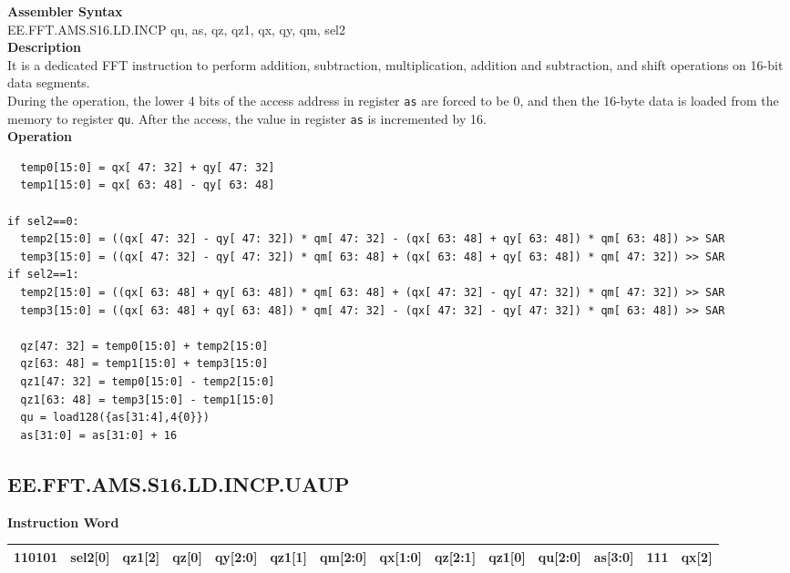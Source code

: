 \textbf{Assembler Syntax} \\
EE.FFT.AMS.S16.LD.INCP qu, as, qz, qz1, qx, qy, qm, sel2 \\
\textbf{Description} \\
It is a dedicated FFT instruction to perform addition, subtraction, multiplication, addition and subtraction, and shift operations on 16-bit data segments.\\
During the operation, the lower 4 bits of the access address in register \lstinline{as} are forced to be 0, and then the 16-byte data is loaded from the memory to register \lstinline{qu}. After the access, the value in register \lstinline{as} is incremented by 16.\\
\textbf{Operation}
\begin{lstlisting}
  temp0[15:0] = qx[ 47: 32] + qy[ 47: 32]
  temp1[15:0] = qx[ 63: 48] - qy[ 63: 48]

if sel2==0:
  temp2[15:0] = ((qx[ 47: 32] - qy[ 47: 32]) * qm[ 47: 32] - (qx[ 63: 48] + qy[ 63: 48]) * qm[ 63: 48]) >> SAR
  temp3[15:0] = ((qx[ 47: 32] - qy[ 47: 32]) * qm[ 63: 48] + (qx[ 63: 48] + qy[ 63: 48]) * qm[ 47: 32]) >> SAR
if sel2==1:
  temp2[15:0] = ((qx[ 63: 48] + qy[ 63: 48]) * qm[ 63: 48] + (qx[ 47: 32] - qy[ 47: 32]) * qm[ 47: 32]) >> SAR
  temp3[15:0] = ((qx[ 63: 48] + qy[ 63: 48]) * qm[ 47: 32] - (qx[ 47: 32] - qy[ 47: 32]) * qm[ 63: 48]) >> SAR

  qz[47: 32] = temp0[15:0] + temp2[15:0]
  qz[63: 48] = temp1[15:0] + temp3[15:0]
  qz1[47: 32] = temp0[15:0] - temp2[15:0]
  qz1[63: 48] = temp3[15:0] - temp1[15:0]
  qu = load128({as[31:4],4{0}})
  as[31:0] = as[31:0] + 16
\end{lstlisting}

\clearpage
\subsection{EE.FFT.AMS.S16.LD.INCP.UAUP}\label{instruction:EEFFTAMSS16LDINCPUAUP}
\setlength\tabcolsep{5pt}
\textbf{Instruction Word} \\
\begin{tabular}{|c|c|c|c|c|c|c|c|c|c|c|c|c|c|}
	\hline
	110101 & sel2[0] & qz1[2] & qz[0] & qy[2:0] & qz1[1] & qm[2:0] & qx[1:0] & qz[2:1] & qz1[0] & qu[2:0] & as[3:0] & 111 & qx[2] \\
	\hline
\end{tabular}

